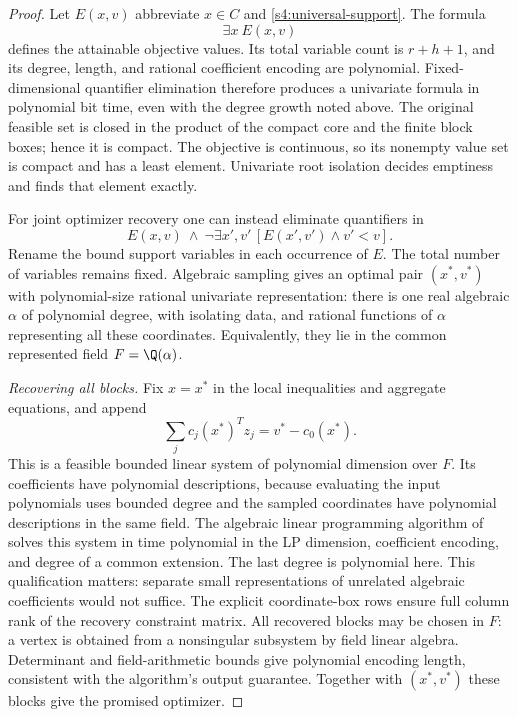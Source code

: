 \begin{proof}
Let $E(x,v)$ abbreviate $x\in C$ and
\eqref{s4:universal-support}. The formula
\[
 \exists x\ E(x,v)
\]
defines the attainable objective values. Its total variable count is
$r+h+1$, and its degree, length, and rational coefficient encoding
are polynomial. Fixed-dimensional quantifier elimination therefore
produces a univariate formula in polynomial bit time, even with the
degree growth noted above. The original feasible set is closed in the
product of the compact core and the finite block boxes; hence it is
compact. The objective is continuous, so its nonempty value set is
compact and has a least element. Univariate root isolation decides
emptiness and finds that element exactly.

For joint optimizer recovery one can instead eliminate quantifiers in
\begin{equation}
 E(x,v)\ \wedge\
 \neg\exists x',v'\,[E(x',v')\wedge v'<v].
 \label{s4:optimal-sample}
\end{equation}
Rename the bound support variables in each occurrence of $E$.
The total number of variables remains fixed. Algebraic sampling gives
an optimal pair $(x^*,v^*)$ with polynomial-size rational univariate
representation: there is one real algebraic $\alpha$ of polynomial
degree, with isolating data, and rational functions of $\alpha$
representing all these coordinates. Equivalently, they lie in the
common represented field $F=\Q(\alpha)$.

\emph{Recovering all blocks.}
Fix $x=x^*$ in the local inequalities and aggregate equations, and
append
\[
 \sum_jc_j(x^*)^Tz_j=v^*-c_0(x^*).
\]
This is a feasible bounded linear system of polynomial dimension over
$F$. Its coefficients have polynomial descriptions, because evaluating
the input polynomials uses bounded degree and the sampled coordinates
have polynomial descriptions in the same field. The algebraic linear
programming algorithm of \citet[Section~5, Remark~1]{s4:adler1994}
solves this system in time polynomial in the LP dimension, coefficient
encoding, and degree of a common extension. The last degree is
polynomial here. This qualification matters: separate small
representations of unrelated algebraic coefficients would not suffice.
The explicit coordinate-box rows ensure full column rank of the
recovery constraint matrix. All recovered blocks may be chosen in $F$: a vertex is obtained from
a nonsingular subsystem by field linear algebra. Determinant and
field-arithmetic bounds give polynomial encoding length, consistent
with the algorithm's output guarantee. Together with $(x^*,v^*)$ these
blocks give the promised optimizer.


\end{proof}
